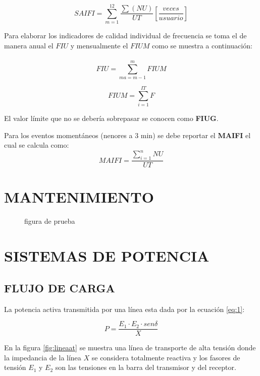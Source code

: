 \documentclass[a5paper]{book}%
\begin{document}
    \[ SAIFI  = \sum_{m=1}^{12}\dfrac{\sum(NU)}{UT}   \left[  \dfrac{veces}{usuario} \right]  \]

    Para elaborar los indicadores de calidad  individual de frecuencia se toma el de manera anual el $FIU$ y mensualmente el $FIUM$ como se muestra a continuación:\\\\

    \[  FIU = \sum_{ma=m-1}^{m} FIUM \]

    \[ FIUM = \sum_{i=1}^{IT} F\]

    El  valor límite que no se debería sobrepasar se conocen como  \textbf{FIUG}.

    Para los eventos momentáneos (nenores a 3 min) se debe reportar el \textbf{MAIFI} el cual se calcula como:
    \[ MAIFI = \dfrac{\sum_{i=1}^{n}NU }{UT}\]
    
    


\chapter{MANTENIMIENTO}


\begin{figure}[H]
  \centering
  \caption{figura de prueba}
  \label{fig:prueba}
\end{figure}

\chapter{SISTEMAS DE  POTENCIA}

\section{FLUJO DE CARGA}
La potencia activa transmitida por una línea esta dada por la ecuación \ref{eq:1}:

\begin{equation}
  \label{eq:1}
  P=\dfrac{E_{1} \cdot E_{2} \cdot sen\delta } {X}
\end{equation}

En la figura \ref{fig:lineaat} se muestra una línea de transporte de alta tensión donde la impedancia de la línea \textit{$X$} se considera totalmente reactiva y los fasores de tensión  \textbf{$E_{1}$ }y \textbf{$E_{2}$} son las tensiones en la barra del transmisor y del receptor.\\\\
\end{document}
